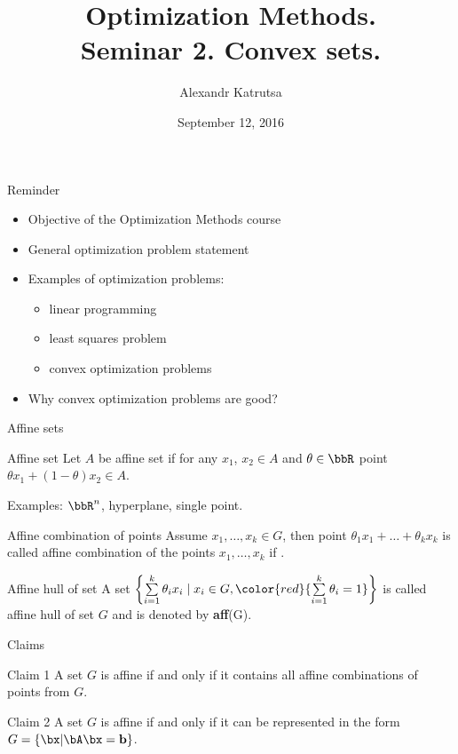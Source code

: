 \documentclass[12pt,russian]{beamer}
\title[Seminar 2]{Optimization Methods. \\
Seminar 2. Convex sets.}
\author{Alexandr Katrutsa}
\institute{Moscow Institute of Physics and Technology,\\
Department of Computational and Applied Mathematics}
\date{September 12, 2016}
\begin{document}
\begin{frame}
\maketitle
\end{frame}

\begin{frame}{Reminder}

\begin{itemize}
\item Objective of the Optimization Methods course
\item General optimization problem statement
\item Examples of optimization problems: 
\begin{itemize}
\item linear programming
\item least squares problem
\item convex optimization problems
\end{itemize}
\item Why convex optimization problems are good?
\end{itemize}
\end{frame}

\begin{frame}{Affine sets}
\small
\begin{block}{Affine set}
Let $A$ be affine set if for any $x_1$, $x_2 \in A$ and $\theta \in \bbR$ point $\theta x_1 + (1 - \theta)x_2 \in A$.
\end{block}
Examples: $\bbR^n$, hyperplane, single point.

\begin{block}{Affine combination of points}
Assume $x_1, \ldots, x_k \in G$, then point $\theta_1 x_1 + \ldots + \theta_k x_k$ is called affine combination of the points $x_1,\ldots,x_k$ if {}.
\end{block}

\begin{block}{Affine hull of set}
A set $\left\{ \sum\limits_{i=1}^k \theta_i x_i \; | \; x_i \in G, {\color{red}{\sum\limits_{i=1}^k \theta_i = 1}} \right\}$ is called affine hull of set $G$ and is denoted by \textbf{aff}(G).
\end{block}
\end{frame}

\begin{frame}{Claims}

\begin{block}{Claim 1}
A set $G$ is affine if and only if it contains all affine combinations of points from $G$.
\end{block}

\begin{block}{Claim 2}
A set $G$ is affine if and only if it can be represented in the form  $G = \{\bx | \bA\bx = \mathbf{b} \}$.
\end{block}
\end{frame}
\end{document}
